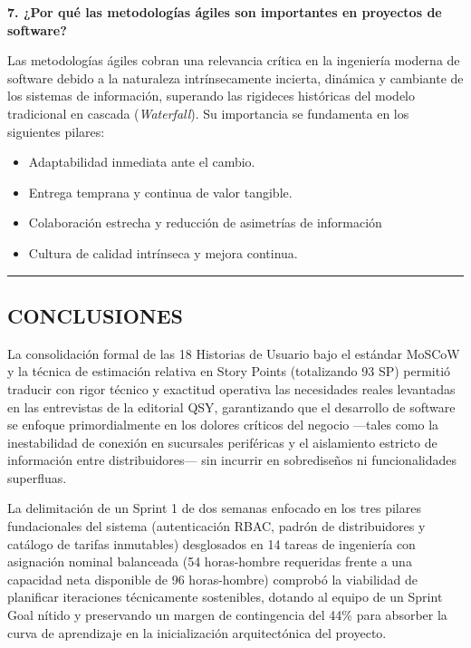 \vspace{0.6em}
\noindent\textbf{\color{mauve} 7. ¿Por qué las metodologías ágiles son importantes en proyectos de software?}\par
\noindent Las metodologías ágiles cobran una relevancia crítica en la ingeniería moderna de software debido a la naturaleza intrínsecamente incierta, dinámica y cambiante de los sistemas de información, superando las rigideces históricas del modelo tradicional en cascada (\textit{Waterfall}). Su importancia se fundamenta en los siguientes pilares:
\begin{itemize}
    \item Adaptabilidad inmediata ante el cambio.
    \item Entrega temprana y continua de valor tangible.
    \item Colaboración estrecha y reducción de asimetrías de información
    \item Cultura de calidad intrínseca y mejora continua.
\end{itemize}

\hrule
\vspace{0.8em}

\subsection{CONCLUSIONES}

\noindent La consolidación formal de las 18 Historias de Usuario bajo el estándar MoSCoW y la técnica de estimación relativa en Story Points (totalizando 93 SP) permitió traducir con rigor técnico y exactitud operativa las necesidades reales levantadas en las entrevistas de la editorial QSY, garantizando que el desarrollo de software se enfoque primordialmente en los dolores críticos del negocio —tales como la inestabilidad de conexión en sucursales periféricas y el aislamiento estricto de información entre distribuidores— sin incurrir en sobrediseños ni funcionalidades superfluas.

\vspace{0.6em}
\noindent La delimitación de un Sprint 1 de dos semanas enfocado en los tres pilares fundacionales del sistema (autenticación RBAC, padrón de distribuidores y catálogo de tarifas inmutables) desglosados en 14 tareas de ingeniería con asignación nominal balanceada (54 horas-hombre requeridas frente a una capacidad neta disponible de 96 horas-hombre) comprobó la viabilidad de planificar iteraciones técnicamente sostenibles, dotando al equipo de un Sprint Goal nítido y preservando un margen de contingencia del 44\% para absorber la curva de aprendizaje en la inicialización arquitectónica del proyecto.

